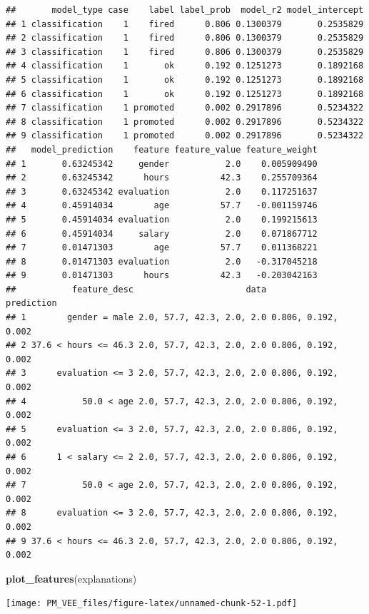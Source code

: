 \documentclass[]{krantz}
\newenvironment{Shaded}{\begin{snugshade}}{\end{snugshade}}
\newcommand{\KeywordTok}[1]{\textcolor[rgb]{0.13,0.29,0.53}{\textbf{#1}}}
\newcommand{\NormalTok}[1]{#1}
\theoremstyle{definition}
\theoremstyle{definition}
\theoremstyle{definition}
\theoremstyle{remark}
\begin{document}
\begin{verbatim}
##       model_type case    label label_prob  model_r2 model_intercept
## 1 classification    1    fired      0.806 0.1300379       0.2535829
## 2 classification    1    fired      0.806 0.1300379       0.2535829
## 3 classification    1    fired      0.806 0.1300379       0.2535829
## 4 classification    1       ok      0.192 0.1251273       0.1892168
## 5 classification    1       ok      0.192 0.1251273       0.1892168
## 6 classification    1       ok      0.192 0.1251273       0.1892168
## 7 classification    1 promoted      0.002 0.2917896       0.5234322
## 8 classification    1 promoted      0.002 0.2917896       0.5234322
## 9 classification    1 promoted      0.002 0.2917896       0.5234322
##   model_prediction    feature feature_value feature_weight
## 1       0.63245342     gender           2.0    0.005909490
## 2       0.63245342      hours          42.3    0.255709364
## 3       0.63245342 evaluation           2.0    0.117251637
## 4       0.45914034        age          57.7   -0.001159746
## 5       0.45914034 evaluation           2.0    0.199215613
## 6       0.45914034     salary           2.0    0.071867712
## 7       0.01471303        age          57.7    0.011368221
## 8       0.01471303 evaluation           2.0   -0.317045218
## 9       0.01471303      hours          42.3   -0.203042163
##           feature_desc                      data          prediction
## 1        gender = male 2.0, 57.7, 42.3, 2.0, 2.0 0.806, 0.192, 0.002
## 2 37.6 < hours <= 46.3 2.0, 57.7, 42.3, 2.0, 2.0 0.806, 0.192, 0.002
## 3      evaluation <= 3 2.0, 57.7, 42.3, 2.0, 2.0 0.806, 0.192, 0.002
## 4           50.0 < age 2.0, 57.7, 42.3, 2.0, 2.0 0.806, 0.192, 0.002
## 5      evaluation <= 3 2.0, 57.7, 42.3, 2.0, 2.0 0.806, 0.192, 0.002
## 6      1 < salary <= 2 2.0, 57.7, 42.3, 2.0, 2.0 0.806, 0.192, 0.002
## 7           50.0 < age 2.0, 57.7, 42.3, 2.0, 2.0 0.806, 0.192, 0.002
## 8      evaluation <= 3 2.0, 57.7, 42.3, 2.0, 2.0 0.806, 0.192, 0.002
## 9 37.6 < hours <= 46.3 2.0, 57.7, 42.3, 2.0, 2.0 0.806, 0.192, 0.002
\end{verbatim}

\begin{Shaded}
\begin{Highlighting}[]
\KeywordTok{plot_features}\NormalTok{(explanations)}
\end{Highlighting}
\end{Shaded}

\texttt{[image: PM\_VEE\_files/figure-latex/unnamed-chunk-52-1.pdf]}
\end{document}

